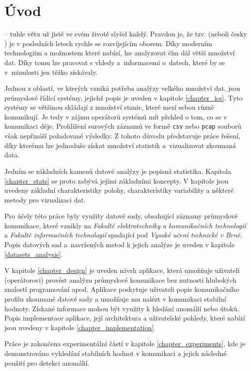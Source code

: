 \chapter{Úvod}

 -- tuhle větu už jistě ve svém životě slyšel každý. Pravdou je, že tzv.  (neboli česky ) je v posledních letech rychle se rozvíjejícím oborem. Díky moderním technologiím a možnostem které nabízí, lze analyzovat čím dál větší množství dat. Díky tomu lze pracovat s vhledy a~informacemi o~datech, které by se v~minulosti jen těžko získávaly.

Jednou z oblastí, ve kterých vzniká potřeba analýzy velkého množství dat, jsou průmyslové řídící systémy, jejichž popis je uveden v kapitole \ref{chapter_ics}. Tyto systémy se většinou skládají z množství stanic, které mezí sebou různě komunikují. Je tedy v zájmu operátorů systémů mít přehled o tom, co se v komunikaci děje. Prohlížení surových záznamů ve formě \texttt{csv} nebo \texttt{pcap} souborů však nepřináší požadované výsledky. Z tohoto důvodu představuje práce řešení, díky kterému lze jednoduše získat množství statistik a~vizualizovat zkoumaná data.



Jedním se základních kamenů datové analýzy je popisná statistika. Kapitola \ref{chapter_stats} se proto zabývá jejími základními koncepty. V kapitole jsou uvedeny základní charakteristiky polohy, charakteristiky variability a některé metody pro vizualizaci dat.

Pro účely této práce byly využity datové sady, obsahující záznamy průmyslové komunikace, které vznikly na \emph{Fakultě elektrotechniky a komunikačních technologií} a \emph{Fakultě informačních technologií} spadající pod \emph{Vysoké učení technické v Brně}. Popis datových sad a~navržených metod k jejich analýze je uveden v kapitole \ref{datasets_analysis}.

V kapitole \ref{chapter_design} je uveden návrh aplikace, která umožňuje uživateli (operátorovi) provést analýzu průmyslové komunikace bez nutnosti hlubokých znalostí programování apod. Aplikace poskytuje uživateli popis komunikačního profilu zkoumané datové sady a umožňuje mu nalézt v komunikaci stabilní hodnoty. Získané informace mohou být využity k hledání anomálií nebo útoků. Popis implementace aplikace, její architektura a uživatelské pohledy, které nabízí jsou uvedeny v kapitole \ref{chapter_implementation}.

Práce je zakončena experimentální částí v kapitole \ref{chapter_experiments}, kde je demonstrováno vyhledání stabilních hodnot v komunikaci a jejich následné použití pro detekci anomálií.




